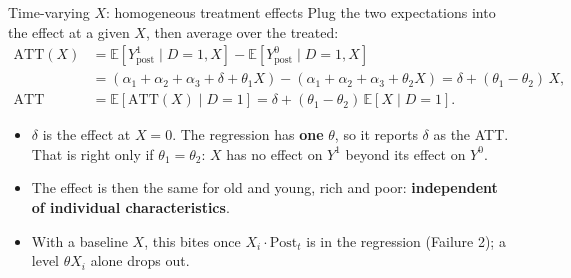 \documentclass[
  11pt,
  ignorenonframetext,
  aspectratio=169,
]{beamer}
\providecommand{\tightlist}{%
  \setlength{\itemsep}{0pt}\setlength{\parskip}{0pt}}
\begin{document}
\begin{frame}{Time-varying \(X\): homogeneous treatment effects}
\protect{}\label{time-varying-x-homogeneous-treatment-effects}
Plug the two expectations into the effect at a given \(X\), then average
over the treated: \[
\begin{aligned}
\text{ATT}(X) &= \mathbb{E}[Y^1_{\text{post}} \mid D=1, X] - \mathbb{E}[Y^0_{\text{post}} \mid D=1, X] \\
&= (\alpha_1 + \alpha_2 + \alpha_3 + \delta + \theta_1 X) - (\alpha_1 + \alpha_2 + \alpha_3 + \theta_2 X) = \delta + (\theta_1 - \theta_2)\,X , \\
\text{ATT} &= \mathbb{E}[\text{ATT}(X) \mid D=1] = \delta + (\theta_1 - \theta_2)\,\mathbb{E}[X \mid D=1] .
\end{aligned}
\]

\begin{itemize}
\tightlist
\item
  \(\delta\) is the effect at \(X = 0\). The regression has \textbf{one}
  \(\theta\), so it reports \(\delta\) as the ATT. That is right only if
  \(\theta_1 = \theta_2\): \(X\) has no effect on \(Y^1\) beyond its
  effect on \(Y^0\).
\item
  The effect is then the same for old and young, rich and poor:
  \textbf{independent of individual characteristics}.
\item
  With a baseline \(X\), this bites once \(X_i \cdot \text{Post}_t\) is
  in the regression (Failure 2); a level \(\theta X_i\) alone drops out.
\end{itemize}
\end{frame}
\end{document}
